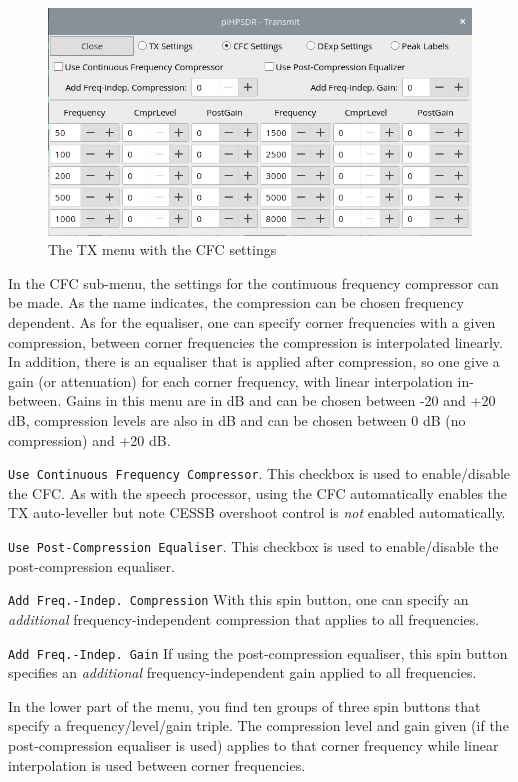 \documentclass[12pt]{book}
\def\rett#1{\texttt{\color{red}#1}}
\begin{document}
\begin{figure}[ht]
\center
\includegraphics[scale=0.45]{TX_CFC.png}
\caption{The TX menu with the CFC settings}
\label{fig:CFCmenu}
\end{figure}

In the CFC sub-menu, the settings for the continuous frequency compressor can be made.
As the name indicates, the compression can be chosen frequency dependent. As for the
equaliser, one can specify corner frequencies with a given compression, between corner
frequencies the compression is interpolated linearly. In addition, there is an equaliser that
is applied after compression, so one give a gain (or attenuation) for each corner
frequency, with linear interpolation in-between. Gains in this menu are in dB and
can be chosen between -20 and +20 dB, compression levels are also in dB and can be chosen
between 0 dB (no compression) and +20 dB.

\rett{Use Continuous Frequency Compressor}. This checkbox is used to enable/disable the CFC. As with
the speech processor, using the CFC automatically enables the TX auto-leveller but note CESSB
overshoot control is \textit{not} enabled automatically.

\rett{Use Post-Compression Equaliser}. This checkbox is used  to enable/disable the post-compression
equaliser.

\rett{Add Freq.-Indep. Compression} With this spin button, one can specify an \textit{additional}
frequency-independent compression that applies to all frequencies.

\rett{Add Freq.-Indep. Gain} If using the post-compression equaliser, this spin button specifies an
\textit{additional} frequency-independent gain applied to all frequencies.

In the lower part of the menu, you find ten groups of three spin buttons that specify a frequency/level/gain
triple. The compression level and gain given (if the post-compression equaliser is used) applies to that
corner frequency while linear interpolation is used between corner frequencies.
\end{document}
